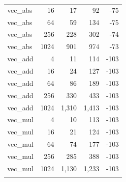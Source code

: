 \begin{center}
\begin{longtable}{l r r r r}
vec_abs & 16 & 17 & 92 & -75 \\ 
vec_abs & 64 & 59 & 134 & -75 \\ 
vec_abs & 256 & 228 & 302 & -74 \\ 
vec_abs & 1024 & 901 & 974 & -73 \\ 
vec_add & 4 & 11 & 114 & -103 \\ 
vec_add & 16 & 24 & 127 & -103 \\ 
vec_add & 64 & 86 & 189 & -103 \\ 
vec_add & 256 & 330 & 433 & -103 \\ 
vec_add & 1024 & 1,310 & 1,413 & -103 \\ 
vec_mul & 4 & 10 & 113 & -103 \\ 
vec_mul & 16 & 21 & 124 & -103 \\ 
vec_mul & 64 & 74 & 177 & -103 \\ 
vec_mul & 256 & 285 & 388 & -103 \\ 
vec_mul & 1024 & 1,130 & 1,233 & -103 \\ 
\hline\n\end{longtable}
\end{center}
